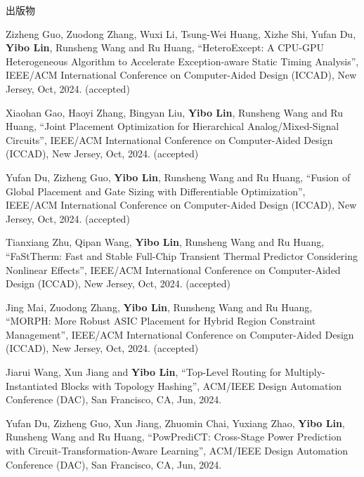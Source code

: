 \begin{rSection}{出版物}
\begin{description}[font=\normalfont, rightmargin=2em]
\item[{[C107]}]{
        Zizheng Guo, Zuodong Zhang, Wuxi Li, Tsung-Wei Huang, Xizhe Shi, Yufan Du, \textbf{Yibo Lin}, Runsheng Wang and Ru Huang, 
    ``HeteroExcept: A CPU-GPU Heterogeneous Algorithm to Accelerate Exception-aware Static Timing Analysis'', 
    IEEE/ACM International Conference on Computer-Aided Design (ICCAD), New Jersey, Oct, 2024.
    (accepted)
}
            

\item[{[C106]}]{
        Xiaohan Gao, Haoyi Zhang, Bingyan Liu, \textbf{Yibo Lin}, Runsheng Wang and Ru Huang, 
    ``Joint Placement Optimization for Hierarchical Analog/Mixed-Signal Circuits'', 
    IEEE/ACM International Conference on Computer-Aided Design (ICCAD), New Jersey, Oct, 2024.
    (accepted)
}
            

\item[{[C105]}]{
        Yufan Du, Zizheng Guo, \textbf{Yibo Lin}, Runsheng Wang and Ru Huang, 
    ``Fusion of Global Placement and Gate Sizing with Differentiable Optimization'', 
    IEEE/ACM International Conference on Computer-Aided Design (ICCAD), New Jersey, Oct, 2024.
    (accepted)
}
            

\item[{[C104]}]{
        Tianxiang Zhu, Qipan Wang, \textbf{Yibo Lin}, Runsheng Wang and Ru Huang, 
    ``FaStTherm: Fast and Stable Full-Chip Transient Thermal Predictor Considering Nonlinear Effects'', 
    IEEE/ACM International Conference on Computer-Aided Design (ICCAD), New Jersey, Oct, 2024.
    (accepted)
}
            

\item[{[C103]}]{
        Jing Mai, Zuodong Zhang, \textbf{Yibo Lin}, Runsheng Wang and Ru Huang, 
    ``MORPH: More Robust ASIC Placement for Hybrid Region Constraint Management'', 
    IEEE/ACM International Conference on Computer-Aided Design (ICCAD), New Jersey, Oct, 2024.
    (accepted)
}
            

\item[{[C102]}]{
        Jiarui Wang, Xun Jiang and \textbf{Yibo Lin}, 
    ``Top-Level Routing for Multiply-Instantiated Blocks with Topology Hashing'', 
    ACM/IEEE Design Automation Conference (DAC), San Francisco, CA, Jun, 2024.
    
}
            

\item[{[C101]}]{
        Yufan Du, Zizheng Guo, Xun Jiang, Zhuomin Chai, Yuxiang Zhao, \textbf{Yibo Lin}, Runsheng Wang and Ru Huang, 
    ``PowPrediCT: Cross-Stage Power Prediction with Circuit-Transformation-Aware Learning'', 
    ACM/IEEE Design Automation Conference (DAC), San Francisco, CA, Jun, 2024.
    
}
\end{description}
\end{rSection}
